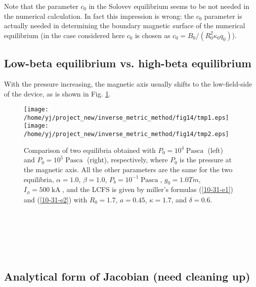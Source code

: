 \documentclass{llncs}
\newcommand{\tmop}[1]{\ensuremath{\operatorname{#1}}}
\begin{document}
Note that the parameter $c_0$ in the Solovev equilibrium seems to be not
needed in the numerical calculation. In fact this impression is wrong: the
$c_0$ parameter is actually needed in determining the boundary magnetic
surface of the numerical equilibrium (in the case considered here $c_0$ is
chosen as $c_0 = B_0 / (R_0^2 \kappa_0 q_0)$).

\subsection{Low-beta equilibrium vs. high-beta equilibrium}

With the pressure increasing, the magnetic axis usually shifts to the
low-field-side of the device, as is shown in Fig. \ref{10-31-e8}.

\begin{figure}[h]
  \texttt{[image: /home/yj/project\_new/inverse\_metric\_method/fig14/tmp1.eps]}\texttt{[image: /home/yj/project\_new/inverse\_metric\_method/fig14/tmp2.eps]}
  \caption{\label{10-31-e8}Comparison of two equilibria obtained with $P_0 =
  10^4 \tmop{Pasca}$ (left) and $P_0 = 10^5 \tmop{Pasca}$ (right),
  respectively, where $P_0$ is the pressure at the magnetic axis. All the
  other parameters are the same for the two equilibria, $\alpha = 1.0$, $\beta
  = 1.0$, $P_b = 10^{- 1} \tmop{Pasca}$, $g_0 = 1.0 T m$, $I_{\phi} = 500
  \tmop{kA}$, and the LCFS is given by miller's formulas (\ref{10-31-e1}) and
  (\ref{10-31-e2}) with $R_0 = 1.7$, $a = 0.45$, $\kappa = 1.7$, and $\delta =
  0.6$.}
\end{figure}

\

\

\

\subsection{Analytical form of Jacobian (need cleaning up)}
\end{document}
